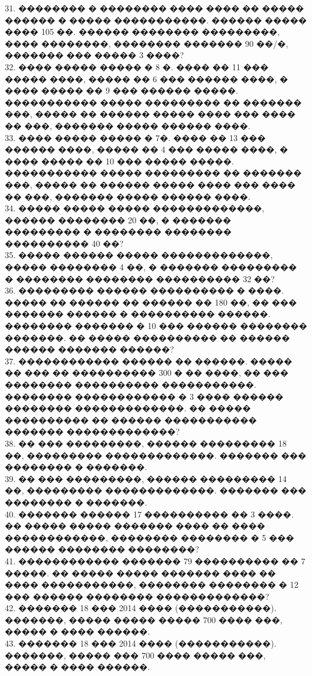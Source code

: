 \documentclass[12pt]{article}
\begin{document}
31. �������� � �������� ���� ���� �� ����� ������ � ����� �����������. ������ ����� ���� 105 ��. ������ �������� ���������, ���� ��������, �������� ������� 90 ��/�, ������� ��� ����� 3 ����?\\
32. ���� ����� ����� � 8 �. ���� �� 11 ��� ����� ����, ����� �� 6 ��� ������ ����, � ���� ����� �� 9 ��� ������ �����. ����������� ����� ��������� �� ������� ���, ����� �� ������ ����� ���� ��� ���� �� ���, ������� ����� ������ ����.\\
33. ���� ����� ����� � 7�. ���� �� 13 ��� ������ ����, ����� �� 4 ��� ����� ����, � ���� ����� �� 10 ��� ����� �����. ����������� ����� ��������� �� ������� ���, ����� �� ������ ����� ���� ��� ���� �� ���, ������� ����� ������ ����.\\
34. ����� ����� ����� �������������, ������ �������� 20 ��, � ������� ��������� � �������� �������� ���������� 40 ��?\\
35. ����� ������ ����� �������������, ����� �������� 4 ��, � ������� ��������� � �������� �������� ���������� 32 ��?\\
36. ��������� ������ ���������� � ����. ����� �� ������ �� ������ �� 180 ��, �� ��� ������� ������ � ���������� ������. �������� ������� � 10 ��� ������ �������� �������. �� ����� ���������� �� ������ ������ ������� ������?\\
37. ������������ ������ �� ������. ����� �� ��� �� ���������� 300 � �� ����, �� ��� �������� ���������� �����������. �������� ������������ � 3 ���� ������ �������� �������������. �� ����� ���������� �� ������ ����������� ������� �������������?\\
38. �� ��� ���������, ������ ��������� 18 ��, ��������� �������������. ������� ��� �������� � �������.\\
39. �� ��� ���������, ������ ��������� 14 ��, ��������� �������������. ������� ��� �������� � �������.\\
40. ������� ������ 17 ���������� �� 3 ����. �� ����� ����� ������� ���� �� ���� ������������, �������� �������� � 5 ��� ������ �������� ��������?\\
41. ������������ ������� 79 ���������� �� 7 �����. �� ����� ����� ������� ���� �� ���� �����������, �������� �������� � 12 ��� ������ �������� �������������?\\
42. ������� 18 ��� 2014 ���� (�����������). �������, ����� ����� ����� 700 ���� ���, ����� � ���� ������.\\
43. ������� 18 ��� 2014 ���� (�����������). �������, ����� ��� 700 ���� ����� ���, ����� � ���� ������.\\
\end{document}

